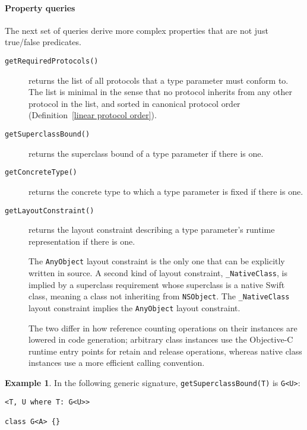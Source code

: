 \documentclass[a4paper,headsepline,bibliography=totoc,toc=flat,fleqn,twoside=semi]{scrbook}
\theoremstyle{definition}
\theoremstyle{definition}
\newtheorem{example}{Example}[chapter]
\theoremstyle{definition}
\begin{document}
\paragraph{Property queries}
The next set of queries derive more complex properties that are not just true/false predicates.
\begin{description}
\item [\texttt{getRequiredProtocols()}] returns the list of all protocols that a type parameter must conform to. The list is minimal in the sense that no protocol inherits from any other protocol in the list, and sorted in canonical protocol order (Definition~\ref{linear protocol order}).
\item [\texttt{getSuperclassBound()}] returns the superclass bound of a type parameter if there is one.
\item [\texttt{getConcreteType()}] returns the concrete type to which a type parameter is fixed if there is one.
\item [\texttt{getLayoutConstraint()}] returns the layout constraint describing a type parameter's runtime representation if there is one.

The \texttt{AnyObject} layout constraint is the only one that can be explicitly written in source. A second kind of layout constraint, \texttt{\_NativeClass}, is implied by a superclass requirement whose superclass is a native Swift class, meaning a class not inheriting from \texttt{NSObject}. The \texttt{\_NativeClass} layout constraint implies the \texttt{AnyObject} layout constraint.

The two differ in how reference counting operations on their instances are lowered in code generation; arbitrary class instances use the Objective-C runtime entry points for retain and release operations, whereas native class instances use a more efficient calling convention.
\end{description}

\begin{example}
In the following generic signature, \texttt{getSuperclassBound(T)} is \texttt{G<U>}:
\begin{Verbatim}
<T, U where T: G<U>>

class G<A> {}
\end{Verbatim}
\end{example}
\end{document}
